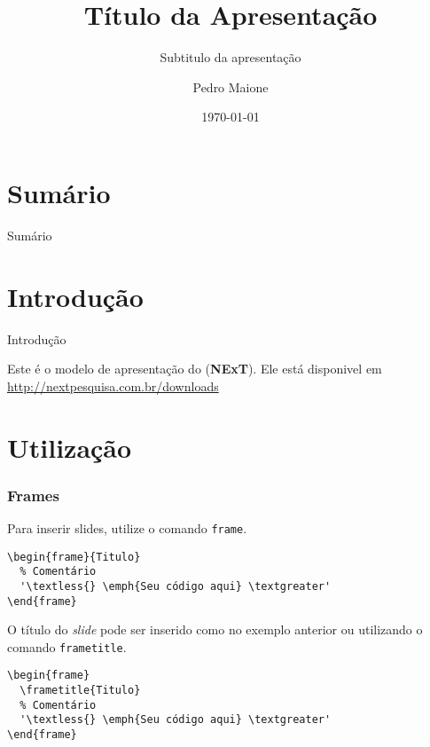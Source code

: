 \documentclass[10pt,aspectratio=43,xcolor,compress]{beamer}
\title{Título da Apresentação}
\subtitle{Subtitulo da apresentação}
\date{\today}
\author{Pedro Maione}
\institute{\NExT}
\begin{document}

\maketitle

\section*{Sumário}
\begin{frame}{Sumário}
  \tableofcontents[hideallsubsections]
\end{frame}

\section{Introdução}

\begin{frame}{Introdução}

  Este é o modelo de apresentação do \textbf{\NExT} (\textbf{NExT}).
  Ele está disponivel em \url{http://nextpesquisa.com.br/downloads}

\end{frame}

\section{Utilização}

\begin{frame}[containsverbatim]
  \frametitle{Frames}

  Para inserir slides, utilize o comando \lstinline|frame|.

\begin{lstlisting}[style=customlatex]
\begin{frame}{Titulo}
  % Comentário
  '\textless{} \emph{Seu código aqui} \textgreater'
\end{frame}
\end{lstlisting}

  O título do \emph{slide} pode ser inserido como no exemplo anterior ou utilizando o comando \lstinline|frametitle|.

\begin{lstlisting}[style=customlatex]
\begin{frame}
  \frametitle{Titulo}
  % Comentário
  '\textless{} \emph{Seu código aqui} \textgreater'
\end{frame}
\end{lstlisting}

\end{frame}
\end{document}
